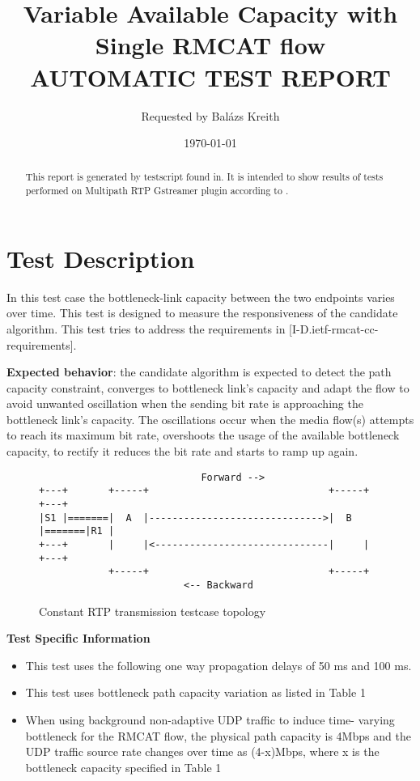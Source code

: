 \documentclass[a4paper]{article}
\title{
Variable Available Capacity with Single RMCAT flow
\\[1cm]
\large \textbf{AUTOMATIC TEST REPORT}
\\[1cm]
}
\author{
Requested by 
Balázs Kreith
}
\date{\today}
\begin{document}
\maketitle


\begin{abstract}
This report is generated by testscript found in\cite{mprtp_gstreamer_github}. It is intended to show results of tests performed on Multipath RTP Gstreamer plugin according to \cite{rmcat_test_draft}.
\end{abstract}

\section{Test Description}


\label{sec:introduction}
 
In this test case the bottleneck-link capacity between the two
endpoints varies over time.  This test is designed to measure the
responsiveness of the candidate algorithm.  This test tries to
address the requirements in [I-D.ietf-rmcat-cc-requirements].

\textbf{Expected behavior}: the candidate algorithm is expected to detect the
path capacity constraint, converges to bottleneck link's capacity and
adapt the flow to avoid unwanted oscillation when the sending bit
rate is approaching the bottleneck link's capacity.  The oscillations
occur when the media flow(s) attempts to reach its maximum bit rate,
overshoots the usage of the available bottleneck capacity, to rectify
it reduces the bit rate and starts to ramp up again.

\begin{figure}
\begin{verbatim}
                            Forward -->
+---+       +-----+                               +-----+       +---+
|S1 |=======|  A  |------------------------------>|  B  |=======|R1 |
+---+       |     |<------------------------------|     |       +---+
            +-----+                               +-----+
                         <-- Backward
\end{verbatim}
\caption{Constant RTP transmission testcase topology}
\label{fig:ascii-box}
\end{figure}

\textbf{Test Specific Information}\
\begin{itemize}
\item This test uses the following one way propagation delays of 50
 ms and 100 ms.
\item This test uses bottleneck path capacity variation as listed in
 Table 1
\item When using background non-adaptive UDP traffic to induce time-
varying bottleneck for the RMCAT flow, the physical path
capacity is 4Mbps and the UDP traffic source rate changes over
time as (4-x)Mbps, where x is the bottleneck capacity specified
in Table 1
\end{itemize}
\end{document}
